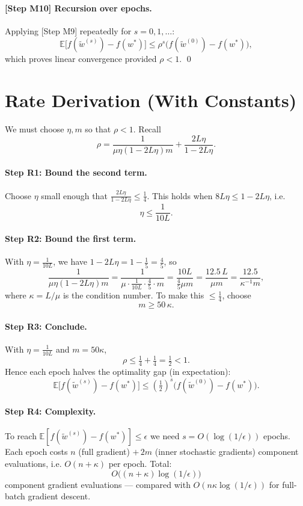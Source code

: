 \documentclass{article}
\begin{document}
\paragraph{[Step M10] Recursion over epochs.}
Applying [Step M9] repeatedly for $s=0,1,\dots$:
\[
\mathbb{E}\big[f(\tilde{w}^{(s)})-f(w^*)\big] \le \rho^s\big(f(\tilde{w}^{(0)})-f(w^*)\big),
\]
which proves linear convergence provided $\rho<1$. \qed

\section*{Rate Derivation (With Constants)}

We must choose $\eta,m$ so that $\rho<1$. Recall
\[
\rho = \frac{1}{\mu\eta(1-2L\eta)m} + \frac{2L\eta}{1-2L\eta}.
\]

\paragraph{Step R1: Bound the second term.}
Choose $\eta$ small enough that $\tfrac{2L\eta}{1-2L\eta} \le \tfrac{1}{4}$. This holds when $8L\eta \le 1-2L\eta$, i.e.
\[
\eta \le \frac{1}{10L}.
\]

\paragraph{Step R2: Bound the first term.}
With $\eta = \tfrac{1}{10L}$, we have $1-2L\eta = 1 - \tfrac{1}{5} = \tfrac{4}{5}$, so
\[
\frac{1}{\mu\eta(1-2L\eta)m} = \frac{1}{\mu\cdot \tfrac{1}{10L}\cdot \tfrac45\cdot m} = \frac{10L}{\tfrac{4}{5}\mu m} = \frac{12.5\,L}{\mu m} = \frac{12.5}{\kappa^{-1} m},
\]
where $\kappa = L/\mu$ is the condition number. To make this $\le \tfrac14$, choose
\[
m \ge 50\,\kappa.
\]

\paragraph{Step R3: Conclude.}
With $\eta = \tfrac{1}{10L}$ and $m = 50\kappa$,
\[
\rho \le \tfrac14 + \tfrac14 = \tfrac12 < 1.
\]
Hence each epoch halves the optimality gap (in expectation):
\[
\mathbb{E}\big[f(\tilde{w}^{(s)})-f(w^*)\big] \le \left(\tfrac12\right)^s\big(f(\tilde{w}^{(0)})-f(w^*)\big).
\]

\paragraph{Step R4: Complexity.}
To reach $\mathbb{E}[f(\tilde{w}^{(s)})-f(w^*)]\le\epsilon$ we need $s = O(\log(1/\epsilon))$ epochs. Each epoch costs $n$ (full gradient) $+\, 2m$ (inner stochastic gradients) component evaluations, i.e. $O(n + \kappa)$ per epoch. Total:
\[
O\big((n+\kappa)\log(1/\epsilon)\big)
\]
component gradient evaluations --- compared with $O(n\kappa\log(1/\epsilon))$ for full-batch gradient descent.
\end{document}
